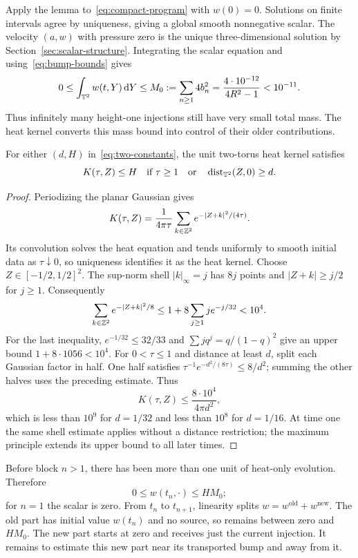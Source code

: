 Apply the lemma to~\eqref{eq:compact-program} with $w(0)=0$.
Solutions on finite intervals agree by uniqueness, giving a global
smooth nonnegative scalar. The velocity $(a,w)$ with pressure zero
is the unique three-dimensional solution by
Section~\ref{sec:scalar-structure}. Integrating the scalar equation
and using~\eqref{eq:bump-bounds} gives
\begin{equation}\label{eq:small-mass}
 0\le\int_{\mathbb T^2}w(t,Y)\,\mathrm d Y
 \le M_0:=\sum_{n\ge1}4b_n^2
 =\frac{4\cdot10^{-12}}{4R^2-1}<10^{-11}.
\end{equation}
Thus infinitely many height-one injections still have very small total
mass. The heat kernel converts this mass bound into control of their
older contributions.

\begin{lemma}\label{lem:heat-bounds}
For either $(d,H)$ in~\eqref{eq:two-constants}, the unit two-torus
heat kernel satisfies
\begin{equation}\label{eq:heat-bound}
 K(\tau,Z)\le H
 \quad\hbox{if }\tau\ge1
 \quad\hbox{or}\quad\operatorname{dist}_{\mathbb T^2}(Z,0)\ge d.
\end{equation}
\end{lemma}
\begin{proof}
Periodizing the planar Gaussian gives
\[
 K(\tau,Z)=\frac1{4\pi\tau}
       \sum_{k\in\mathbb Z^2}e^{-|Z+k|^2/(4\tau)}.
\]
Its convolution solves the heat equation and tends uniformly to smooth
initial data as $\tau\downarrow0$, so uniqueness identifies it as the
heat kernel. Choose $Z\in[-1/2,1/2]^2$. The sup-norm shell
$|k|_\infty=j$ has $8j$ points and $|Z+k|\ge j/2$ for $j\ge1$.
Consequently
\[
 \sum_{k\in\mathbb Z^2}e^{-|Z+k|^2/8}
 \le1+8\sum_{j\ge1}j e^{-j/32}<10^4.
\]
For the last inequality, $e^{-1/32}\le32/33$ and
$\sum j q^j=q/(1-q)^2$ give an upper bound $1+8\cdot1056<10^4$.
For $0<\tau\le1$ and distance at least $d$, split each Gaussian
factor in half. One half satisfies
$\tau^{-1}e^{-d^2/(8\tau)}\le8/d^2$; summing the other halves
uses the preceding estimate. Thus
\[
 K(\tau,Z)\le\frac{8\cdot10^4}{4\pi d^2},
\]
which is less than $10^9$ for $d=1/32$ and less than $10^8$ for
$d=1/16$. At time one the same shell estimate applies without a
distance restriction; the maximum principle extends its upper bound
to all later times.
\end{proof}

Before block $n>1$, there has been more than one unit of heat-only
evolution. Therefore
\begin{equation}\label{eq:old-mass}
 0\le w(t_n,\cdot)\le HM_0;
\end{equation}
for $n=1$ the scalar is zero. From $t_n$ to $t_{n+1}$, linearity
splits $w=w^{\mathrm{old}}+w^{\mathrm{new}}$. The old part has
initial value $w(t_n)$ and no source, so remains between zero and
$HM_0$. The new part starts at zero and receives just the current
injection. It remains to estimate this new part near its transported
bump and away from it.

